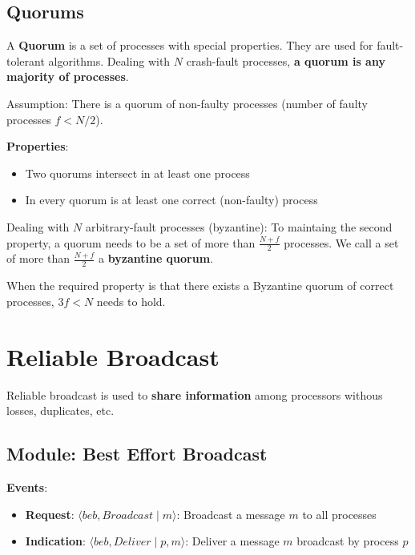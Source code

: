 \documentclass[12pt,A4]{extarticle}
\newcommand{\highlight}[1]{\textcolor{highlightColor}{\textbf{#1}}}
\begin{document}
\subsection{Quorums}
A \highlight{Quorum} is a set of processes with special properties. They are used for fault-tolerant algorithms. Dealing with $N$ crash-fault processes, \textbf{a quorum is any majority of processes}.\par
Assumption: There is a quorum of non-faulty processes (number of faulty processes $f < N/2$).\par
\textbf{Properties}:
\begin{itemize}
  \item{Two quorums intersect in at least one process}
  \item{In every quorum is at least one correct (non-faulty) process}
\end{itemize}
Dealing with $N$ arbitrary-fault processes (byzantine): To maintaing the second property, a quorum needs to be a set of more than $\frac{N+f}{2}$ processes. We call a set of more than $\frac{N+f}{2}$ a \highlight{byzantine quorum}.\par
When the required property is that there exists a Byzantine quorum of correct processes, $3f < N$ needs to hold.

\section{Reliable Broadcast}
Reliable broadcast is used to \textbf{share information} among processors withous losses, duplicates, etc.
\subsection{Module: Best Effort Broadcast}
\textbf{Events}:
\begin{itemize}
  \item{\textbf{Request}: $\langle beb, \textit{Broadcast} \mid m \rangle$: Broadcast a message $m$ to all processes}
  \item{\textbf{Indication}: $\langle beb, \textit{Deliver} \mid p, m \rangle$: Deliver a message $m$ broadcast by process $p$}
\end{itemize}
\end{document}
